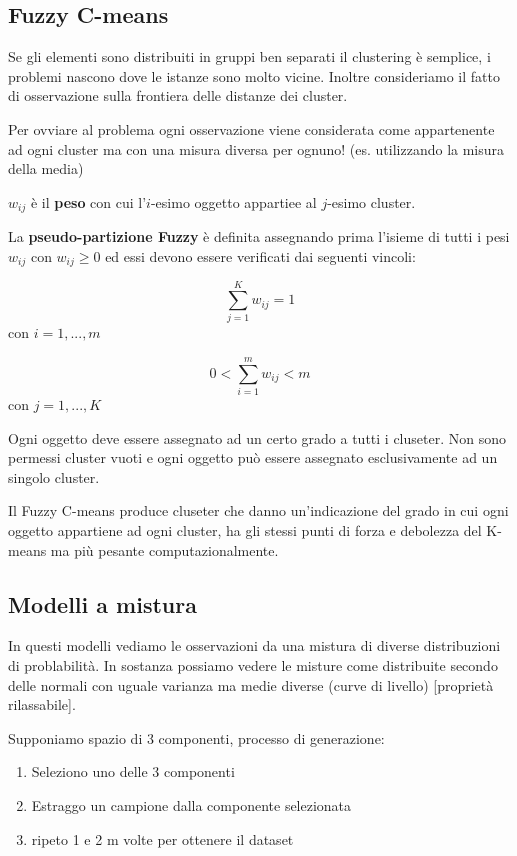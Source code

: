 \subsection{Fuzzy C-means}
Se gli elementi sono distribuiti in gruppi ben separati il clustering \`e semplice, i problemi nascono dove le istanze sono molto vicine. Inoltre consideriamo il fatto di osservazione sulla frontiera delle distanze dei cluster. 

Per ovviare al problema ogni osservazione viene considerata come appartenente ad ogni cluster ma con una misura diversa per ognuno! (es. utilizzando la misura della media)

$w_{ij}$ \`e il \textbf{peso} con cui l'$i$-esimo oggetto appartiee al $j$-esimo cluster.

La \textbf{pseudo-partizione Fuzzy} \`e definita assegnando prima l'isieme di tutti i pesi $w_{ij}$ con $w_{ij} \geq 0$ ed essi devono essere verificati dai seguenti vincoli:

\[\sum_{j=1}^{K} w_{ij} = 1\] con $i = 1, ..., m$

\[ 0 < \sum_{i=1}^{m}w_{ij} < m\] con $j = 1, ..., K$

Ogni oggetto deve essere assegnato ad un certo grado a tutti i cluseter. Non sono permessi cluster vuoti e ogni oggetto pu\`o essere assegnato esclusivamente ad un singolo cluster.

Il Fuzzy C-means produce cluseter che danno un'indicazione del grado in cui ogni oggetto appartiene ad ogni cluster, ha gli stessi punti di forza e debolezza del K-means ma pi\`u pesante computazionalmente.

\subsection{Modelli a mistura}
In questi modelli vediamo le osservazioni da una mistura di diverse distribuzioni di problabilit\`a. In sostanza possiamo vedere le misture come distribuite secondo delle normali con uguale varianza ma medie diverse (curve di livello) [propriet\`a rilassabile]. 

Supponiamo spazio di 3 componenti, processo di generazione:
\begin{enumerate}
	\item Seleziono uno delle 3 componenti
	\item Estraggo un campione dalla componente selezionata
	\item ripeto 1 e 2 m volte per ottenere il dataset
\end{enumerate} 

